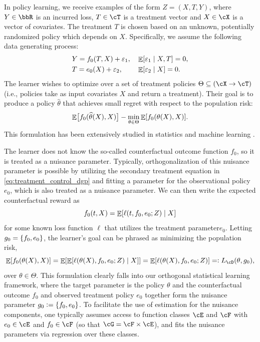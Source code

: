 \documentclass[11pt]{article} %
\newcommand{\preprint}[1]{\iftoggle{journal}{}{#1}}
\newcommand{\pref}[1]{\cref{#1}}
\theoremstyle{theorem}  %
\theoremstyle{plain}
\DeclarePairedDelimiter{\brk}{[}{]}
\DeclarePairedDelimiter{\crl}{\{}{\}}
\DeclareMathOperator{\En}{\mathbb{E}}
\newcommand{\veps}{\varepsilon}
\newcommand{\ldef}{\vcentcolon=}
\newcommand{\rdef}{=\vcentcolon}
\newcommand{\wh}[1]{\widehat{#1}}
\newcommand{\R}{\bbR}
\newcommand{\poprisk}{L_{\cD}}
\newcommand{\esttwo}{\wh{\theta}}
\newcommand{\target}{\Theta}
\newcommand{\param}{parameter\xspace}
\begin{document}
In policy learning, we receive examples of the form $Z=(X,T,Y)$, where $Y\in \R$ is an incurred loss, $T \in \cT$ is a treatment vector and $X\in \cX$ is a vector of covariates. %
The treatment $T$ is chosen based on an unknown, potentially randomized policy which depends on $X$. Specifically, we assume the following data generating process:
\begin{equation}
\label{eq:treatment_control_dgp}
\begin{aligned}
&Y = f_0(T, X) + \veps_1,&&\En\brk*{\veps_1\mid{}X,T}=0,\\
&T=e_0(X) + \veps_2,&&\En\brk*{\veps_2\mid{}X}=0.
\end{aligned}
\end{equation}
The learner wishes to optimize over a set of treatment policies $\target\subseteq{}(\cX\to\cT)$ (i.e., policies take as input covariates $X$ and return a treatment). Their goal is to produce a policy $\esttwo$ that achieves small regret with respect to the population risk:
\begin{equation}
\label{eq:policy_risk}
\En\brk[\big]{f_0(\esttwo(X), X)} - \min_{\theta \in \target} \En\brk*{f_0(\theta(X), X)}.
\end{equation}
This formulation has been extensively studied in statistics \citep{qian2011performance,zhao2012estimating,zhou2017residual,athey2017efficient,zhou2018offline} and machine learning \citep{beygelzimer2009offset,dudik2011doubly,swaminathan2015counterfactual,kallus2018policy}\preprint{; in the latter, it is sometimes referred to as counterfactual risk minimization}.

The learner does not know the so-called counterfactual outcome function $f_0$, so it is treated as a nuisance parameter. Typically, orthogonalization of this nuisance parameter is possible by utilizing the secondary treatment equation in \pref{eq:treatment_control_dgp} and fitting a \param for the observational policy $e_0$, which is also treated as a nuisance parameter. We can then write the expected counterfactual reward as
\begin{equation}
f_0(t, X) = \En\brk*{\ell(t, f_0, e_0;Z) \mid X}
\end{equation}
for some known loss function $\ell$ that utilizes the treatment \param $e_0$. Letting $g_0=\crl*{f_0,e_0}$, the learner's goal can be phrased as minimizing the population risk,
\begin{equation}
\label{eq:policy_generic}
\En\brk*{f_0(\theta(X), X)} = \En\brk*{\En\brk*{\ell(\theta(X), f_0, e_0;Z) \mid X}} = \En\brk*{\ell(\theta(X), f_0, e_0;Z)} \rdef \poprisk(\theta, g_0),
\end{equation}
over $\theta \in \target$. This formulation clearly falls into our orthogonal statistical learning framework, where the target parameter is the policy $\theta$ and the counterfactual outcome $f_0$ and observed treatment policy $e_0$ together form the nuisance parameter $g_0\ldef\crl*{f_0,e_0}$. To facilitate the use of estimation for the nuisance components, one typically assumes access to function classes $\cE$ and $\cF$ with $e_0\in\cE$ and $f_0\in\cF$ (so that $\cG=\cF\times\cE$), and fits the nuisance parameters via regression over these classes.
\end{document}
